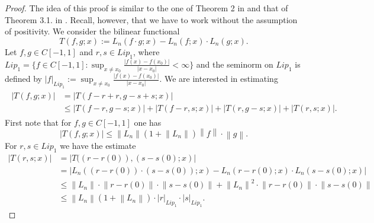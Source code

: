 \documentclass[12pt,leqno,a4paper,dvips,twoside]{article}
\begin{document}
{\begin{proof}
The idea of this proof is similar to the one of Theorem 2 in \cite{acugora:2011} and that of Theorem 3.1. in \cite{rusu:2011}. Recall, however, 
that we have to work without the assumption of positivity.
We consider the bilinear functional 
	\begin{equation*}
		T(f,g;x):=L_n(f\cdot g;x)-L_n(f;x)\cdot L_n(g;x).
	\end{equation*}
Let $f,g\in C[-1,1]$ and $r,s\in Lip_1$, where $Lip_1=\{f\in C[-1,1]: \sup_{x\neq x_0}\frac{\left|f(x)-f(x_0)\right|}{\left|x-x_0\right|}<\infty\}$ and the seminorm on $Lip_1$ is defined by $\left|f\right|_{Lip_1}:=\sup_{x\neq x_0}\frac{\left|f(x)-f(x_0)\right|}{\left|x-x_0\right|}$. 
We are interested in estimating
\begin{align} \label{ineq*}
	\begin{split}
		\left|T(f,g;x)\right| &=\left|T(f-r+r,g-s+s;x)\right|\\
								       &\leq \left|T(f-r,g-s;x)\right|+\left|T(f-r,s;x)\right|+\left|T(r,g-s;x)\right|+\left|T(r,s;x)\right|.	
	\end{split}	
\end{align}
First note that for $f,g\in C[-1,1]$ one has
	\begin{equation*}
		\left|T(f,g;x)\right|\leq \left\|L_n\right\|(1+\left\|L_n\right\|)\left\|f\right\|\cdot \left\|g\right\|.
	\end{equation*}
For $r,s\in Lip_1$ we have the estimate
	\begin{align*}
		\left|T(r,s;x)\right|&=\left|T((r-r(0)),(s-s(0);x)\right|\\
		&=\left|L_n((r-r(0))\cdot (s-s(0));x)-L_n(r-r(0);x)\cdot L_n(s-s(0);x)\right|\\
		&\leq \left\|L_n\right\|\cdot \left\|r-r(0)\right\|\cdot \left\|s-s(0)\right\|+\left\|L_n\right\|^2\cdot \left\|r-r(0)\right\|\cdot  \left\|s-s(0)\right\|\\
		&\leq \left\|L_n\right\|(1+\left\|L_n\right\|)\cdot\left|r\right|_{Lip_1}\cdot\left|s\right|_{Lip_1}.
	\end{align*}


\end{proof}}
\end{document}
